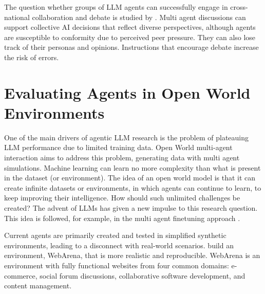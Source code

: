 The question whether groups of LLM agents can successfully engage in cross-national collaboration and debate is studied by \citep{baltaji2024conformity}. Multi agent discussions can support collective AI decisions that reflect diverse perspectives, although agents are susceptible to conformity due to perceived peer pressure. They can also lose track of their personas and opinions. Instructions that encourage debate increase the risk of errors.

\section{Evaluating Agents in Open World Environments}\label{sec:openworld}
One of the main drivers of agentic LLM research is the problem of plateauing LLM performance due to limited training data. Open World multi-agent interaction aims to address this problem, generating data with multi agent simulations.
%
Machine learning can learn no more complexity than what is present in the dataset (or environment). The idea of an open world model is that it can create infinite datasets or environments, in which agents can continue to learn, to keep improving their intelligence. How should such unlimited challenges be created? The advent of LLMs has given a new impulse to this research question. %
This idea is followed, for example,  in the multi agent finetuning approach  \citep{subramaniam2025multiagent}.

Current agents are primarily created and tested in simplified synthetic environments, leading to
a disconnect with real-world scenarios. \citet{zhou2023webarena} build an environment, WebArena,
that is more realistic and reproducible. WebArena is an environment
with fully functional websites from four common domains: e-commerce, social
forum discussions, collaborative software development, and content management.


